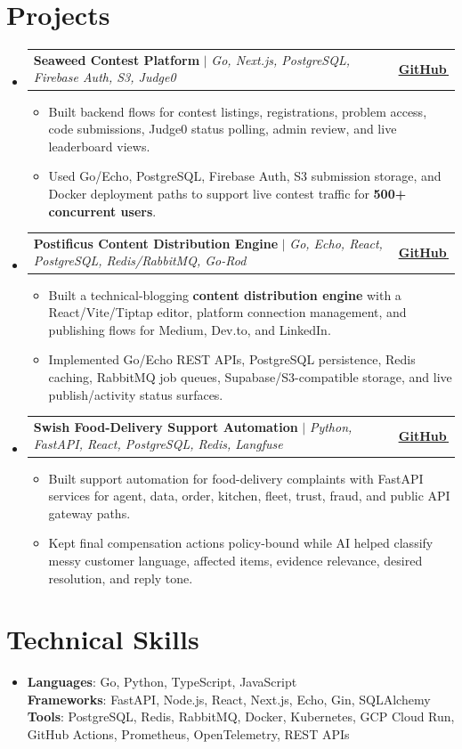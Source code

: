\documentclass[letterpaper,11pt]{article}
\makeatletter
\newcommand{\bodyhref}[2]{\href{#1}{\underline{#2}\,\faExternalLink*}}
\newcommand{\resumeItem}[1]{\item{\fontsize{8.82pt}{9.28pt}\selectfont #1\vspace{-0.7pt}}}
\newcommand{\resumeProjectHeading}[2]{
    \item
    \begin{tabular*}{1.0\textwidth}{l@{\extracolsep{\fill}}r}
      \small#1 & \textbf{\small #2}\\
    \end{tabular*}\vspace{-4pt}
}
\newcommand{\resumeSubHeadingListStart}{\begin{itemize}[leftmargin=0.0in, label={}, itemsep=0.6pt, topsep=0pt, parsep=0pt, partopsep=0pt]}
\newcommand{\resumeSubHeadingListEnd}{\end{itemize}}
\newcommand{\resumeItemListStart}{\begin{itemize}[leftmargin=0.16in,itemsep=0.3pt,topsep=0.9pt,parsep=0pt,partopsep=0pt]}
\newcommand{\resumeItemListEnd}{\end{itemize}\vspace{-3pt}}
\makeatother
\begin{document}
\section{Projects}
\resumeSubHeadingListStart
\resumeProjectHeading
{\textbf{Seaweed Contest Platform} $|$ \emph{Go, Next.js, PostgreSQL, Firebase Auth, S3, Judge0}}{\bodyhref{https://github.com/unichronic/seaweed-fe}{GitHub}}
\resumeItemListStart
\resumeItem{Built backend flows for contest listings, registrations, problem access, code submissions, Judge0 status polling, admin review, and live leaderboard views.}
\resumeItem{Used Go/Echo, PostgreSQL, Firebase Auth, S3 submission storage, and Docker deployment paths to support live contest traffic for \textbf{500+ concurrent users}.}
\resumeItemListEnd
\resumeProjectHeading
{\textbf{Postificus Content Distribution Engine} $|$ \emph{Go, Echo, React, PostgreSQL, Redis/RabbitMQ, Go-Rod}}{\bodyhref{https://github.com/unichronic/postificus}{GitHub}}
\resumeItemListStart
\resumeItem{Built a technical-blogging \textbf{content distribution engine} with a React/Vite/Tiptap editor, platform connection management, and publishing flows for Medium, Dev.to, and LinkedIn.}
\resumeItem{Implemented Go/Echo REST APIs, PostgreSQL persistence, Redis caching, RabbitMQ job queues, Supabase/S3-compatible storage, and live publish/activity status surfaces.}
\resumeItemListEnd
\resumeProjectHeading
{\textbf{Swish Food-Delivery Support Automation} $|$ \emph{Python, FastAPI, React, PostgreSQL, Redis, Langfuse}}{\bodyhref{https://github.com/unichronic/swishagent}{GitHub}}
\resumeItemListStart
\resumeItem{Built support automation for food-delivery complaints with FastAPI services for agent, data, order, kitchen, fleet, trust, fraud, and public API gateway paths.}
\resumeItem{Kept final compensation actions policy-bound while AI helped classify messy customer language, affected items, evidence relevance, desired resolution, and reply tone.}
\resumeItemListEnd
\resumeSubHeadingListEnd

\section{Technical Skills}
\begin{itemize}[leftmargin=0.15in, label={}, topsep=0pt, itemsep=0pt, parsep=0pt, partopsep=0pt]
  \item{\fontsize{9.0pt}{9.25pt}\selectfont
   \textbf{Languages}{: Go, Python, TypeScript, JavaScript} \\
   \textbf{Frameworks}{: FastAPI, Node.js, React, Next.js, Echo, Gin, SQLAlchemy} \\
   \textbf{Tools}{: PostgreSQL, Redis, RabbitMQ, Docker, Kubernetes, GCP Cloud Run, GitHub Actions, Prometheus, OpenTelemetry, REST APIs} \\
  }
\end{itemize}
\end{document}
